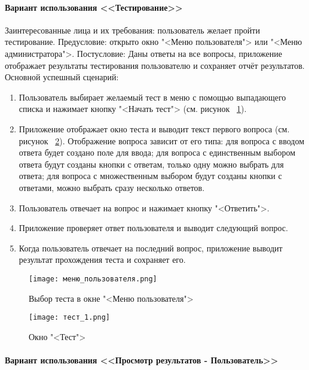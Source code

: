 \paragraph{Вариант использования <<Тестирование>>}

Заинтересованные лица и их требования: пользователь желает пройти тестирование.
\newline Предусловие: открыто окно "<Меню пользователя"> или "<Меню администратора">.
\newline Постусловие: Даны ответы на все вопросы, приложение отображает результаты тестирования пользователю и сохраняет отчёт результатов.
\newline Основной успешный сценарий:
\begin{enumerate}
	\item Пользователь выбирает желаемый тест в меню с помощью выпадающего списка и нажимает кнопку "<Начать тест"> (см. рисунок ~\ref{user_menu_window:image}).
	\item Приложение отображает окно теста и выводит текст первого вопроса (см. рисунок ~\ref{test_window:image}). Отображение вопроса зависит от его типа: для вопроса с вводом ответа будет создано поле для ввода; для вопроса с единственным выбором ответа будут созданы кнопки с ответам, только одну можно выбрать для ответа; для вопроса с множественным выбором будут созданы кнопки с ответами, можно выбрать сразу несколько ответов.
	\item Пользователь отвечает на вопрос и нажимает кнопку "<Ответить">.
	\item Приложение проверяет ответ пользователя и выводит следующий вопрос. 
	\item Когда пользователь отвечает на последний вопрос, приложение выводит результат прохождения теста и сохраняет его.
\end{enumerate}

\newpage
\begin{figure}[ht]
	\centering
	\texttt{[image: меню\_пользователя.png]}
	\caption{Выбор теста в окне "<Меню пользователя">}
	\label{user_menu_window:image}
\end{figure}
\begin{figure}[ht]
	\centering
	\texttt{[image: тест\_1.png]}
	\caption{Окно "<Тест">}
	\label{test_window:image}
\end{figure}

\paragraph{Вариант использования <<Просмотр результатов - Пользователь>>}

